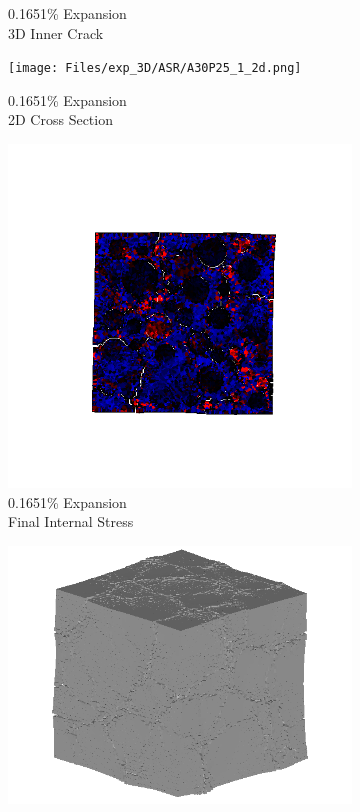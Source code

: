 \begin{figure}[ht!]
\begin{subfigure}{.25\textwidth}
      \caption{0.1651\% Expansion\\3D Inner Crack}
    \end{subfigure}%
    \begin{subfigure}{.25\textwidth}
      \centering
      \texttt{[image: Files/exp\_3D/ASR/A30P25\_1\_2d.png]}
      \caption{0.1651\% Expansion\\2D Cross Section}
    \end{subfigure}%
    \begin{subfigure}{.25\textwidth}
      \centering
      \includegraphics[width=.8\linewidth]{Files/exp_3D/ASR/A30P25_1_stress.png}
      \caption{0.1651\% Expansion\\Final Internal Stress}
    \end{subfigure}
    \begin{subfigure}{.25\textwidth}
      \centering
      \includegraphics[width=.8\linewidth]{Files/exp_3D/ASR/A30P25_2_3d.png}

\end{subfigure}
\end{figure}
